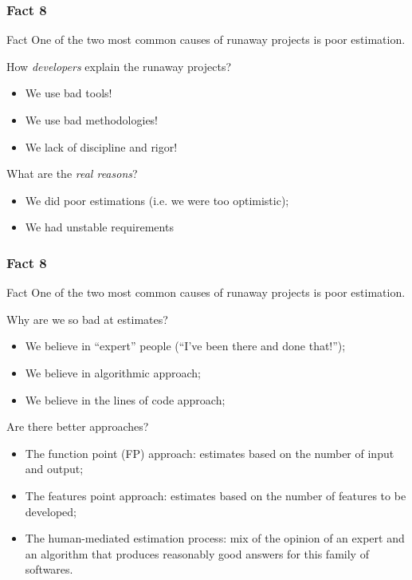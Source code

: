 \documentclass{beamer}
\begin{document}
\begin{frame}
    \frametitle{Fact 8}
    \begin{block}{Fact}
    One of the two most common causes of runaway projects is poor estimation.
    \end{block}
    \pause

    How \textit{developers} explain the runaway projects?
    \pause
    \begin{itemize}
        \item We use bad tools!
        \pause
        \item We use bad methodologies!
        \pause
        \item We lack of discipline and rigor!
    \end{itemize}
    \bigskip

    \pause
    What are the \textit{real reasons}?
    \begin{itemize}
        \item We did poor estimations (i.e. we were too optimistic);
        \pause
        \item We had unstable requirements
    \end{itemize}
\end{frame}

\begin{frame}
    \frametitle{Fact 8}
    \begin{block}{Fact}
    One of the two most common causes of runaway projects is poor estimation.
    \end{block}
    \pause

    Why are we so bad at estimates?
    \begin{itemize}
        \item We believe in \enquote{expert} people (\enquote{I've been there
        and done that!});
        \pause
        \item We believe in algorithmic approach;
        \pause
        \item We believe in the lines of code approach;
    \end{itemize}
    \bigskip

    \pause
    Are there better approaches?
    \begin{itemize}
        \item The function point (FP) approach: estimates based on the number of
        input and output;
        \pause
        \item The features point approach: estimates based on the number of
        features to be developed;
        \pause
        \item The human-mediated estimation process: mix of the opinion of an
        expert and an algorithm that produces reasonably good answers for this
        family of softwares.
    \end{itemize}
\end{frame}
\end{document}
